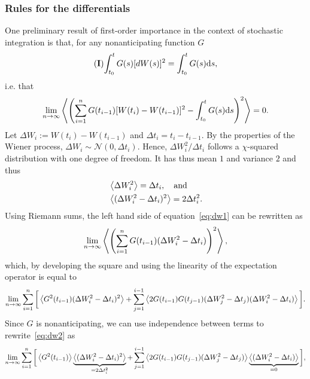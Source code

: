 \subsubsection{Rules for the differentials}
One preliminary result of first-order importance in the context of stochastic integration is that, for any nonanticipating function $G$
\begin{equation} \label{eq:dW=dt_int}
	\mathbf{(I)\!}\int_{t_0}^t G(s) \mathrm [dW(s)]^2 = \int_{t_0}^t G(s) \mathrm ds,	
\end{equation}
i.e. that
\begin{equation} \label{eq:dw1}
	\lim_{n\rightarrow\infty} \left\langle \left(\sum_{i=1}^n G(t_{i-1})[W(t_i)-W(t_{i-1})]^2-\int_{t_0}^t G(s) \mathrm ds\right)^2 \right\rangle = 0.
\end{equation}
Let $\Delta W_i := W(t_i) - W(t_{i-1})$ and $\Delta t_i = t_i - t_{i-1}$. By the properties of the Wiener process, $\Delta W_i \sim \mathcal{N}(0,\Delta t_i)$. Hence, $\Delta W_i^2/\Delta t_i$ follows a $\chi$-squared distribution with one degree of freedom. It has thus mean $1$ and variance $2$ and thus
\begin{subequations} \label{eq:dwprop}
\begin{align}
        &\left\langle \Delta W_i^2 \right\rangle = \Delta t_i, \quad \mbox{and} \label{eq:dwesp}\\
        &\left\langle (\Delta W_i^2 - \Delta t_i)^2 \right\rangle = 2 \Delta t_i^2. \label{eq:dwvar}
\end{align}
\end{subequations}
Using Riemann sums, the left hand side of equation~\eqref{eq:dw1} can be rewritten as
\begin{equation}
	\lim_{n\rightarrow\infty} \left\langle \left(\sum_{i=1}^n G(t_{i-1})(\Delta W_i^2-\Delta t_i)\right)^2 \right\rangle,
\end{equation}
which, by developing the square and using the linearity of the expectation operator is equal to
\begin{equation} \label{eq:dw2}
	\lim_{n\rightarrow\infty} \sum_{i=1}^n \bigg[\left\langle G^2(t_{i-1})(\Delta W_i^2-\Delta t_i)^2 \right\rangle + \sum_{j=1}^{i-1} \left\langle 2G(t_{i-1})G(t_{j-1})(\Delta W_j^2 - \Delta t_j)(\Delta W_i^2 - \Delta t_i) \right\rangle\bigg].
\end{equation}
Since $G$ is nonanticipating, we can use independence between terms to rewrite~\eqref{eq:dw2} as
\begin{equation} \label{eq:dw3}
	\lim_{n\rightarrow\infty} \sum_{i=1}^n \bigg[\left\langle G^2(t_{i-1}) \right\rangle\underbrace{\left\langle (\Delta W_i^2-\Delta t_i)^2 \right\rangle}_{=2\Delta t_i^2} + \sum_{j=1}^{i-1} \left\langle 2G(t_{i-1})G(t_{j-1})(\Delta W_j^2 - \Delta t_j) \right\rangle\underbrace{\left\langle (\Delta W_i^2 - \Delta t_i) \right\rangle}_{=0}\bigg],
\end{equation}
